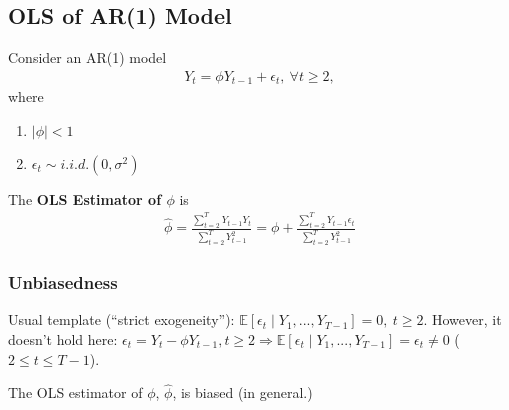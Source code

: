 \documentclass[11pt]{elegantbook}
\begin{document}
\subsection{OLS of AR(1) Model}
Consider an AR(1) model
\begin{equation}
    \begin{aligned}
        Y_t=\phi Y_{t-1}+\epsilon_t,\ \forall t\geq 2,
    \end{aligned}
    \nonumber
\end{equation}
where
\begin{enumerate}
    \item $|\phi|<1$
    \item $\epsilon_t\sim{i.i.d.}(0,\sigma^2)$
\end{enumerate}

The \textbf{OLS Estimator of $\phi$} is
\begin{equation}
    \begin{aligned}
        \hat{\phi}=\frac{\sum_{t=2}^TY_{t-1}Y_t}{\sum_{t=2}^T Y_{t-1}^2}=\phi+\frac{\sum_{t=2}^TY_{t-1}\epsilon_t}{\sum_{t=2}^T Y_{t-1}^2}
    \end{aligned}
    \nonumber
\end{equation}

\subsubsection*{Unbiasedness}
Usual template (``strict exogeneity''): $\mathbb{E}[\epsilon_t\mid Y_1,...,Y_{T-1}]=0,\ t\geq 2$. However, it doesn't hold here: $\epsilon_t=Y_t-\phi Y_{t-1}, t\geq 2 \Rightarrow \mathbb{E}[\epsilon_t\mid Y_1,...,Y_{T-1}]=\epsilon_t\neq 0$ ($2\leq t\leq T-1$).
\begin{claim}
    The OLS estimator of $\phi$, $\hat{\phi}$, is biased (in general.)
\end{claim}
\end{document}
